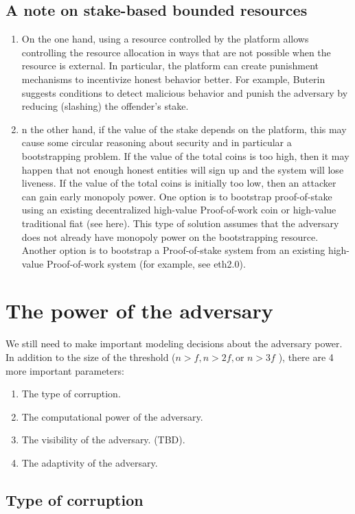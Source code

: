 \subsection{A note on stake-based bounded resources }
\begin{enumerate}
\item On the one hand, using a resource controlled by the platform
allows controlling the resource allocation in ways that are not possible
when the resource is external. In particular, the platform can create
punishment mechanisms to incentivize honest behavior better. For
example, Buterin suggests conditions to detect malicious behavior
and punish the adversary by reducing (slashing) the offender\textquoteright s
stake. 
\item n the other hand, if the value of the stake depends on the platform,
this may cause some circular reasoning about security and in particular
a bootstrapping problem. If the value of the total coins is too high,
then it may happen that not enough honest entities will sign up and
the system will lose liveness. If the value of the total coins is
initially too low, then an attacker can gain early monopoly power.
One option is to bootstrap proof-of-stake using an existing decentralized
high-value Proof-of-work coin or high-value traditional fiat (see
here). This type of solution assumes that the adversary does not already
have monopoly power on the bootstrapping resource. Another option
is to bootstrap a Proof-of-stake system from an existing high-value
Proof-of-work system (for example, see eth2.0).
\end{enumerate}

\section{The power of the adversary }

We still need to make important modeling decisions about the adversary
power. In addition to the size of the threshold ($n>f,n>2f,\text{or }n>3f$
), there are 4 more important parameters:
\begin{enumerate}
\item The type of corruption.
\item The computational power of the adversary.
\item The visibility of the adversary. (TBD).
\item The adaptivity of the adversary.
\end{enumerate}

\subsection{Type of corruption}


